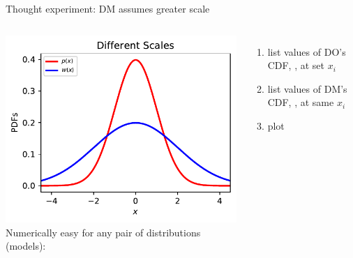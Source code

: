 \begin{frame}{Thought experiment: DM assumes greater scale}
\centering
\begin{columns}%
	\includegraphics[width=\textwidth]{../../figs/2GaussianPDFs2Scales.pdf} \\
Numerically easy for any pair of distributions (models):
\begin{enumerate}
	\item list values of DO's CDF, , at set ${x_i}$
	\item list values of DM's CDF, , at same ${x_i}$
	\item plot  \vs {}
\end{enumerate}
\end{columns}


\end{frame}
